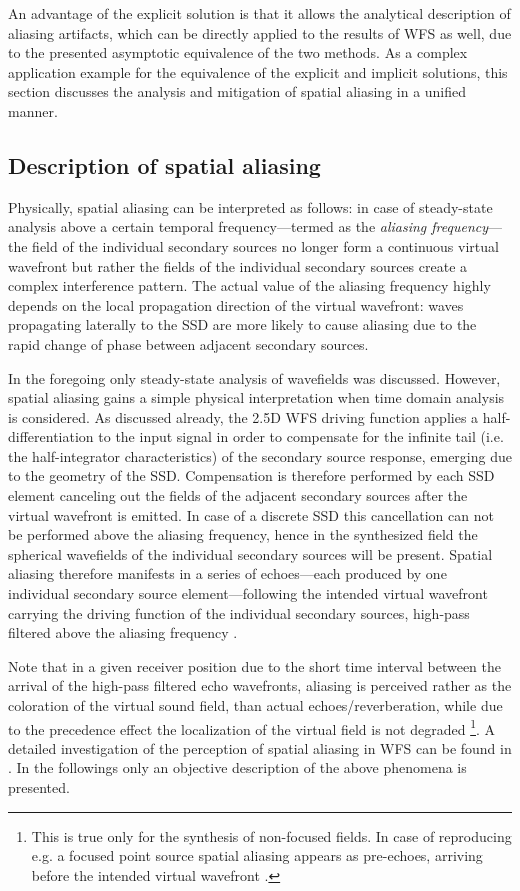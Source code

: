 An advantage of the explicit solution is that it allows the analytical description of aliasing artifacts, which can be directly applied to the results of WFS as well, due to the presented asymptotic equivalence of the two methods.
As a complex application example for the equivalence of the explicit and implicit solutions, this section discusses the analysis and mitigation of spatial aliasing in a unified manner.

\subsection{Description of spatial aliasing}

Physically, spatial aliasing can be interpreted as follows: in case of steady-state analysis above a certain temporal frequency---termed as the \emph{aliasing frequency}--- the field of the individual secondary sources no longer form a continuous virtual wavefront but rather the fields of the individual secondary sources create a complex interference pattern.
The actual value of the aliasing frequency highly depends on the local propagation direction of the virtual wavefront: waves propagating laterally to the SSD are more likely to cause aliasing due to the rapid change of phase between adjacent secondary sources.

In the foregoing only steady-state analysis of wavefields was discussed.
However, spatial aliasing gains a simple physical interpretation when time domain analysis is considered.
As discussed already, the 2.5D WFS driving function applies a half-differentiation to the input signal in order to compensate for the infinite tail (i.e. the half-integrator characteristics) of the secondary source response, emerging due to the geometry of the SSD.
Compensation is therefore performed by each SSD element canceling out the fields of the adjacent secondary sources after the virtual wavefront is emitted.
In case of a discrete SSD this cancellation can not be performed above the aliasing frequency, hence in the synthesized field the spherical wavefields of the individual secondary sources will be present.
Spatial aliasing therefore manifests in a series of echoes---each produced by one individual secondary source element---following the intended virtual wavefront carrying the driving function of the individual secondary sources, high-pass filtered above the aliasing frequency \cite{spors2009spatial}. 

Note that in a given receiver position due to the short time interval between the arrival of the high-pass filtered echo wavefronts, aliasing is perceived rather as the coloration of the virtual sound field, than actual echoes/reverberation, while due to the precedence effect the localization of the virtual field is not degraded \footnote{This is true only for the synthesis of non-focused fields.
In case of reproducing e.g. a focused point source spatial aliasing appears as pre-echoes, arriving before the intended virtual wavefront \cite{Spors2009:FocusedSourceAliasing}.}.
A detailed investigation of the perception of spatial aliasing in WFS can be found in \cite{8371275}.
In the followings only an objective description of the above phenomena is presented.

